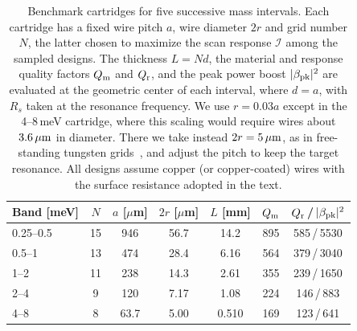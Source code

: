 \documentclass[
  aps,prl,reprint,superscriptaddress,
  amsmath,amssymb,floatfix,nofootinbib
]{revtex4-2}
\newcommand{\Qm}{Q_{\rm m}}
\newcommand{\Qr}{Q_{\rm r}}
\begin{document}
\begin{table}[t]
\caption{Benchmark cartridges for five successive mass intervals. Each cartridge has a fixed wire pitch $a$, wire diameter $2r$ and grid number $N$, the latter chosen to maximize the scan response $\mathcal I$ among the sampled designs. The thickness $L=Nd$, the material and response quality factors $\Qm$ and $\Qr$, and the peak power boost $|\beta_{\rm pk}|^2$ are evaluated at the geometric center of each interval, where $d=a$, with $R_s$ taken at the resonance frequency. We use $r=0.03a$ except in the 4--8\,meV cartridge, where this scaling would require wires about $3.6\,\mu{\rm m}$ in diameter. There we take instead $2r=5\,\mu{\rm m}$, as in free-standing tungsten grids~\cite{Ade:1979,Mok:1979}, and adjust the pitch to keep the target resonance. All designs assume copper (or copper-coated) wires with the surface resistance adopted in the text.}
\label{tab:design}
\begin{ruledtabular}
\begin{tabular}{lcccccc}
Band [meV] & $N$ & $a$ [$\mu$m] & $2r$ [$\mu$m] & $L$ [mm] & $\Qm$ & $\Qr$\,/\,$|\beta_{\rm pk}|^2$\\
\hline
0.25--0.5 & 15 & 946 & 56.7 & 14.2 & 895 & 585\,/\,5530\\
0.5--1 & 13 & 474 & 28.4 & 6.16 & 564 & 379\,/\,3040\\
1--2 & 11 & 238 & 14.3 & 2.61 & 355 & 239\,/\,1650\\
2--4 & 9 & 120 & 7.17 & 1.08 & 224 & 146\,/\,883\\
4--8 & 8 & 63.7 & 5.00 & 0.510 & 169 & 123\,/\,641
\end{tabular}
\end{ruledtabular}
\end{table}
\end{document}

